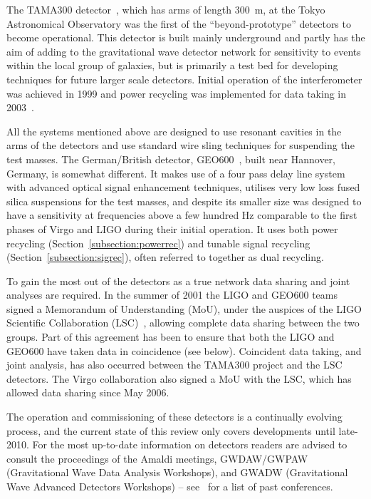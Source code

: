 \documentclass{article}
\begin{document}
The TAMA300 detector~\cite{TAMAweb}, which has arms of length 300~m, at the
Tokyo Astronomical Observatory was the first of the ``beyond-prototype''
detectors to become operational. This detector is built mainly underground and
partly has the aim of adding to the gravitational wave detector network for
sensitivity to events within the local group of galaxies, but is primarily a
test bed for developing techniques for future larger scale detectors. Initial
operation of the interferometer was achieved in 1999 and power recycling was
implemented for data taking in 2003~\cite{Arai:2003}.

All the systems mentioned above are designed to use resonant cavities in the
arms of the detectors and use standard wire sling techniques for suspending the
test masses. The German/British detector, GEO600~\cite{GEOweb}, built near
Hannover, Germany, is somewhat different. It makes use of a four pass delay line
system with advanced optical signal enhancement techniques, utilises very low
loss fused silica suspensions for the test masses, and despite its smaller size
was designed to have a sensitivity at frequencies above a few hundred Hz
comparable to the first phases of Virgo and LIGO during their initial operation.
It uses both power recycling (Section~\ref{subsection:powerrec}) and tunable signal
recycling (Section~\ref{subsection:sigrec}), often referred to together as dual
recycling.

To gain the most out of the detectors as a true network data sharing and joint
analyses are required. In the summer of 2001 the LIGO and GEO600 teams signed a
Memorandum of Understanding (MoU), under the auspices of the LIGO Scientific
Collaboration (LSC)~\cite{LSCweb}, allowing complete data sharing between the
two groups. Part of this agreement has been to ensure that both the LIGO and
GEO600 have taken data in coincidence (see below). Coincident data taking, and
joint analysis, has also occurred between the TAMA300 project and the LSC
detectors. The Virgo collaboration also signed a MoU with the LSC, which has
allowed data sharing since May 2006.

The operation and commissioning of these detectors is a continually evolving
process, and the current state of this review only covers developments until
late-2010. For the most up-to-date information on detectors readers are advised
to consult the proceedings of the Amaldi meetings, GWDAW/GWPAW (Gravitational
Wave Data Analysis Workshops), and GWADW (Gravitational Wave Advanced Detectors
Workshops) -- see~\cite{confs} for a list of past conferences.
\end{document}

